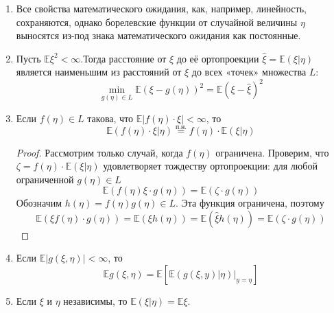 \begin{namedthm}\leavevmode
    \begin{enumerate}
        \item Все свойства математического ожидания, как, например, линейность, сохраняются, однако борелевские функции от случайной величины $\eta$ выносятся из-под знака математического ожидания как постоянные.
        \item Пусть $\mathbb{E} \xi^{2}<\infty$.Тогда расстояние от $\xi$ до её ортопроекции $\widehat{\xi}=\mathbb{E}(\xi | \eta)$ является наименьшим из расстояний от $\xi$ до всех «точек» множества $L$:
        \begin{equation*}
            \min_{g(\eta) \in L} \mathbb{E}(\xi-g(\eta))^{2}=\mathbb{E}(\xi-\widehat{\xi})^{2}
        \end{equation*}
        \item Если $f(\eta) \in L$ такова, что $\mathbb{E}|f(\eta) \cdot \xi|<\infty$, то
        \begin{equation*}
            \mathbb{E}(f(\eta) \cdot \xi | \eta)
            \stackrel{\text{п.н.}}{=}
            f(\eta) \cdot \mathbb{E}(\xi | \eta)
        \end{equation*}
        \begin{proof}
            Рассмотрим только случай, когда $f(\eta)$ ограничена. Проверим, что $\zeta=f(\eta) \cdot \mathbb{E}(\xi | \eta)$ удовлетворяет тождеству ортопроекции: для любой ограниченной $g(\eta) \in L$
            \begin{equation*}
                \mathbb{E}(f(\eta) \xi \cdot g(\eta))=\mathbb{E}(\zeta \cdot g(\eta))
            \end{equation*}
            Обозначим $h(\eta)=f(\eta) g(\eta) \in L$. Эта функция ограничена, поэтому
            \begin{equation*}
                \mathbb{E}(\xi f(\eta) \cdot g(\eta))=\mathbb{E}(\xi h(\eta))=\mathbb{E}(\widehat{\xi} h(\eta))=\mathbb{E}(\zeta \cdot g(\eta))
            \end{equation*}
        \end{proof}
        \item Если $\mathbb{E}|g(\xi, \eta)|<\infty$, то
        \begin{equation*}
            \mathbb{E} g(\xi, \eta)=\mathbb{E}\left[\left.\mathbb{E}(g(\xi, y) | \eta)\right|_{y=\eta}\right]
        \end{equation*}
        \item Если $\xi$ и $\eta$ независимы, то $\mathbb{E}(\xi | \eta)=\mathbb{E} \xi$.
    \end{enumerate}
\end{namedthm}

